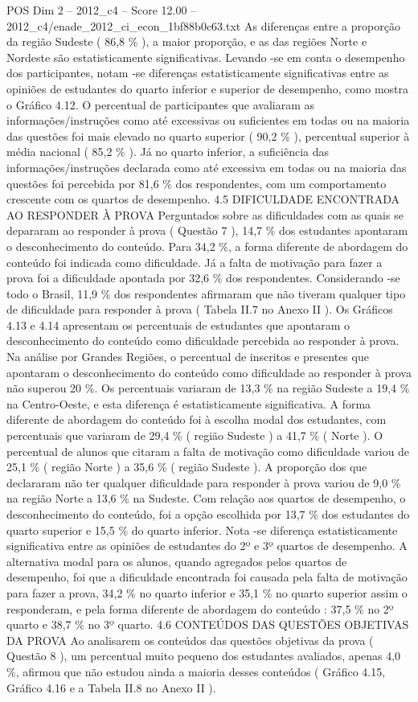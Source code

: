 \begin{textsample}{POS Dim 2 – 2012\_c4 – Score 12.00 – 2012\_c4/enade\_2012\_ci\_econ\_1bf88b0c63.txt}
As diferenças entre a proporção da região Sudeste ( 86,8 \% ), a maior proporção, e as das regiões Norte e Nordeste são estatisticamente significativas.
Levando -se em conta o desempenho dos participantes, notam -se diferenças estatisticamente significativas entre as opiniões de estudantes do quarto inferior e superior de desempenho, como mostra o Gráfico 4.12.
O percentual de participantes que avaliaram as informações/instruções como até excessivas ou suficientes em todas ou na maioria das questões foi mais elevado no quarto superior ( 90,2 \% ), percentual superior à média nacional ( 85,2 \% ).
Já no quarto inferior, a suficiência das informações/instruções declarada como até excessiva em todas ou na maioria das questões foi percebida por 81,6 \% dos respondentes, com um comportamento crescente com os quartos de desempenho. 4.5 DIFICULDADE ENCONTRADA AO RESPONDER À PROVA Perguntados sobre as dificuldades com as quais se depararam ao responder à prova ( Questão 7 ), 14,7 \% dos estudantes apontaram o desconhecimento do conteúdo.
Para 34,2 \%, a forma diferente de abordagem do conteúdo foi indicada como dificuldade.
Já a falta de motivação para fazer a prova foi a dificuldade apontada por 32,6 \% dos respondentes.
Considerando -se todo o Brasil, 11,9 \% dos respondentes afirmaram que não tiveram qualquer tipo de dificuldade para responder à prova ( Tabela II.7 no Anexo II ).
Os Gráficos 4.13 e 4.14 apresentam os percentuais de estudantes que apontaram o desconhecimento do conteúdo como dificuldade percebida ao responder à prova.
Na análise por Grandes Regiões, o percentual de inscritos e presentes que apontaram o desconhecimento do conteúdo como dificuldade ao responder à prova não superou 20 \%.
Os percentuais variaram de 13,3 \% na região Sudeste a 19,4 \% na Centro-Oeste, e esta diferença é estatisticamente significativa.
A forma diferente de abordagem do conteúdo foi à escolha modal dos estudantes, com percentuais que variaram de 29,4 \% ( região Sudeste ) a 41,7 \% ( Norte ).
O percentual de alunos que citaram a falta de motivação como dificuldade variou de 25,1 \% ( região Norte ) a 35,6 \% ( região Sudeste ).
A proporção dos que declararam não ter qualquer dificuldade para responder à prova variou de 9,0 \% na região Norte a 13,6 \% na Sudeste.
Com relação aos quartos de desempenho, o desconhecimento do conteúdo, foi a opção escolhida por 13,7 \% dos estudantes do quarto superior e 15,5 \% do quarto inferior.
Nota -se diferença estatisticamente significativa entre as opiniões de estudantes do 2º e 3º quartos de desempenho.
A alternativa modal para os alunos, quando agregados pelos quartos de desempenho, foi que a dificuldade encontrada foi causada pela falta de motivação para fazer a prova, 34,2 \% no quarto inferior e 35,1 \% no quarto superior assim o responderam, e pela forma diferente de abordagem do conteúdo : 37,5 \% no 2º quarto e 38,7 \% no 3º quarto. 4.6 CONTEÚDOS DAS QUESTÕES OBJETIVAS DA PROVA Ao analisarem os conteúdos das questões objetivas da prova ( Questão 8 ), um percentual muito pequeno dos estudantes avaliados, apenas 4,0 \%, afirmou que não estudou ainda a maioria desses conteúdos ( Gráfico 4.15, Gráfico 4.16 e a Tabela II.8 no Anexo II ).

\end{textsample}
